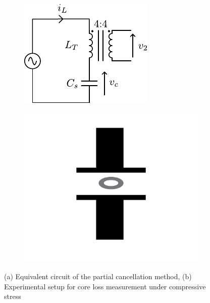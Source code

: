\documentclass[conference]{IEEEtran}
\begin{document}
\begin{figure}[t]
  \begin{subfigure}{\columnwidth}
    \centering
    \includegraphics{figures/partialcancellationcircuit.pdf}
    \caption{}
    \label{fig:partialcancellationcircuit}
  \end{subfigure}
  \begin{subfigure}{\columnwidth}
    \centering
    \includegraphics{figures/experimentalsetup.pdf}
    \caption{}
    \label{fig:experimentalsetup}
  \end{subfigure}
  \caption{(a) Equivalent circuit of the partial cancellation method, (b) Experimental setup for core loss measurement under compressive stress}
\end{figure}
\end{document}
